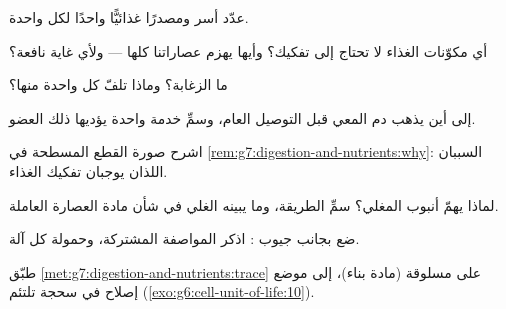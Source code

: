 \begin{exercise}[$\star$]\label{exo:g7:digestion-and-nutrients:3}
عدّد أسر  ومصدرًا غذائيًّا واحدًا لكل واحدة.
\end{exercise}

\begin{exercise}[$\star$]\label{exo:g7:digestion-and-nutrients:4}
أي مكوّنات الغذاء لا تحتاج إلى تفكيك؟ وأيها يهزم عصاراتنا كلها ---
ولأي غاية نافعة؟
\end{exercise}

\begin{exercise}[$\star$]\label{exo:g7:digestion-and-nutrients:5}
ما الزغابة؟ وماذا تلفّ كل واحدة منها؟
\end{exercise}

\begin{exercise}[$\star$]\label{exo:g7:digestion-and-nutrients:6}
إلى أين يذهب دم المعي قبل التوصيل العام، وسمِّ خدمة واحدة يؤديها
ذلك العضو.
\end{exercise}

\begin{exercise}[$\star\star$]\label{exo:g7:digestion-and-nutrients:7}
اشرح صورة القطع المسطحة في
\cref{rem:g7:digestion-and-nutrients:why}: السببان اللذان يوجبان
تفكيك الغذاء.
\end{exercise}

\begin{exercise}[$\star\star$]\label{exo:g7:digestion-and-nutrients:8}
لماذا يهمّ أنبوب  المغلي؟ سمِّ الطريقة، وما يبينه الغلي في
شأن مادة العصارة العاملة.
\end{exercise}

\begin{exercise}[$\star\star$]\label{exo:g7:digestion-and-nutrients:9}
ضع  بجانب جيوب   : اذكر المواصفة
المشتركة، وحمولة كل آلة.
\end{exercise}

\begin{exercise}[$\star\star$]\label{exo:g7:digestion-and-nutrients:10}
طبّق \cref{met:g7:digestion-and-nutrients:trace} على  مسلوقة
(مادة بناء)، إلى موضع إصلاح في سحجة تلتئم
(\cref{exo:g6:cell-unit-of-life:10}).
\end{exercise}

